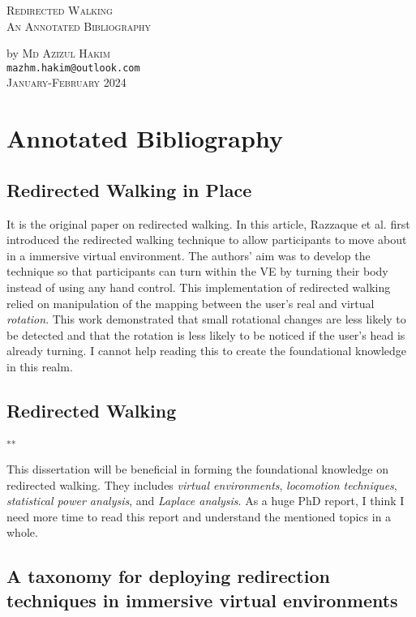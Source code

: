\documentclass[12pt]{article}
\makeatletter
\newcommand\topPageBottom{
\noindent \hrulefill by {\scshape Md Azizul Hakim}\noindent \hrulefill \\
\normalsize
\texttt{mazhm.hakim@outlook.com} \\
\vspace{2.0em}
{\scshape January-February 2024}
}
\makeatother
\begin{document}
\begin{center}
\Huge
{\scshape Redirected Walking} \\
\LARGE
{\scshape An Annotated Bibliography} \\
\large
\topPageBottom
\end{center}

\vspace{2.0em}

\section{Annotated Bibliography}

\subsection{Redirected Walking in Place}

\textbf{\cite{razzaque2002redirected}}

It is the original paper on redirected walking. In this article, Razzaque et al. first introduced the redirected walking technique to allow participants to move about in a immersive virtual environment. The authors' aim was to develop the technique so that participants can turn within the VE by turning their body instead of using any hand control. This implementation of redirected walking relied on manipulation of the mapping between the user's real and virtual \emph{rotation}. This work demonstrated that small rotational changes are less likely to be detected and that the rotation is less likely to be noticed if the user's head is already turning. I cannot help reading this to create the foundational knowledge in this realm.

\subsection{Redirected Walking}
\textbf{\cite{razzaque2005redirected}}\textsuperscript{**}

This dissertation will be beneficial in forming the foundational knowledge on redirected walking. They includes \emph{virtual environments}, \emph{locomotion techniques}, \emph{statistical power analysis}, and \emph{Laplace analysis}. As a huge PhD report, I think I need more time to read this report and understand the mentioned topics in a whole.

\subsection{A taxonomy for deploying redirection techniques in immersive virtual environments}
\textbf{\cite{suma2012taxonomy}}
\end{document}
